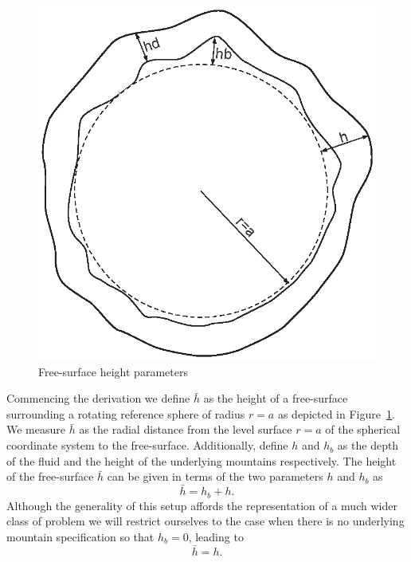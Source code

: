 \begin{figure}[htbp]
	\centering
		\includegraphics[scale=0.65]{IMAGES/freesurfparams.eps}
	\caption{Free-surface height parameters}
	\label{fig:freesurfparams}
\end{figure}
Commencing the derivation we define $\bar{h}$ as the height of a free-surface surrounding a rotating reference sphere of radius $r=a$ as depicted in Figure~\ref{fig:freesurfparams}. We measure $\bar{h}$ as the radial distance from the level surface $r=a$ of the spherical coordinate system to the free-surface. Additionally, define $h$ and $h_b$ as the depth of the fluid and the height of the underlying mountains respectively. The height of the free-surface $\bar{h}$ can be given in terms of the two parameters $h$ and $h_b$ as
\begin{equation}
	\bar{h}=h_b+h.
\end{equation}
Although the generality of this setup affords the representation of a much wider class of problem we will restrict ourselves to the case when there is no underlying mountain specification so that $h_b=0$, leading to
\begin{equation}
	\bar{h}=h.
\end{equation}

